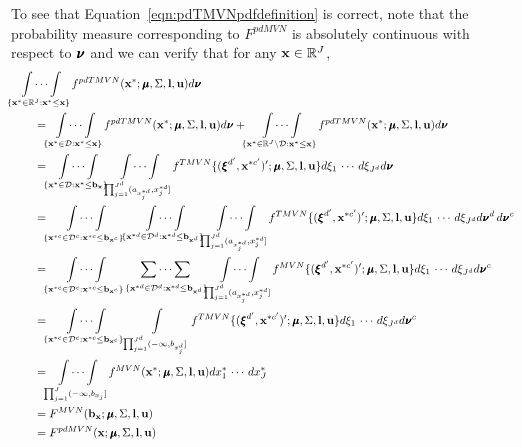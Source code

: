 \documentclass[fleqn]{article}
\begin{document}
To see that Equation~\eqref{eqn:pdTMVNpdfdefinition} is correct, note that the probability measure corresponding to $F^{pdMVN}$ is absolutely continuous with respect to $\bnu$ and we can verify that for any ${\bf x} \in \mathbb{R}^J$,
\begin{align}
&\idotsint\limits_{\{\bx^* \in \mathbb{R}^J : \bx^* \leq \bx \}} f^{pdTMVN}(\bx^* ; \bmu, \Sigma, \bl, \bu) d \bnu \label{eqn:pdTMVNpdfVerification1} \\
&\qquad = \idotsint\limits_{\{\bx^* \in \mathcal{D} : \bx^* \leq \bx \}} f^{pdTMVN}(\bx^* ; \bmu, \Sigma, \bl, \bu) d \bnu + \idotsint\limits_{\{\bx^* \in \mathbb{R}^J \setminus \mathcal{D} : \bx^* \leq \bx \}} f^{pdTMVN}(\bx^* ; \bmu, \Sigma, \bl, \bu) d \bnu \label{eqn:pdTMVNpdfVerification2} \\
&\qquad = \idotsint\limits_{\{\bx^* \in \mathcal{D} : \bx^* \leq \bb_\bx \}} \idotsint\limits_{\prod_{j=1}^{J^d}(a_{x^{*d}_j}, x^{*d}_j]} f^{TMVN}\{(\bxi^{d'}, \bx^{*c'})' ; \bmu, \Sigma, \bl, \bu\} d \xi_1 \, \cdots \, d \xi_{J^d} d \bnu \label{eqn:pdTMVNpdfVerification3} \\
&\qquad = \idotsint\limits_{\{\bx^{*c} \in \mathcal{D}^c : \bx^{*c} \leq \bb_{\bx^c} \vphantom{\mathcal{D}^d}\}} \, \idotsint\limits_{\{\bx^{*d} \in \mathcal{D}^d : \bx^{*d} \leq \bb_{\bx^d} \}} \idotsint\limits_{\prod_{j=1}^{J^d} (a_{x^{*d}_j}, x^{*d}_j]} f^{TMVN}\{(\bxi^{d'}, \bx^{*c'})' ; \bmu, \Sigma, \bl, \bu\} d \xi_1 \, \cdots \, d \xi_{J^d} d \bnu^d \, d \bnu^c \label{eqn:pdTMVNpdfVerification4} \\
&\qquad = \idotsint\limits_{\{\bx^{*c} \in \mathcal{D}^c : \bx^{*c} \leq \bb_{\bx^c} \vphantom{\mathcal{D}^d}\}} \mathop{\sum \cdots \sum \vphantom{\int}}\limits_{\{\bx^{*d} \in \mathcal{D}^d : \bx^{*d} \leq \bb_{\bx^d} \}} \idotsint\limits_{\prod_{j=1}^{J^d}(a_{x^{*d}_j}, x^{*d}_j]} f^{MVN}\{(\bxi^{d'}, \bx^{*c'})' ; \bmu, \Sigma, \bl, \bu\} d \xi_1 \, \cdots \, d \xi_{J^d} d \bnu^c \label{eqn:pdTMVNpdfVerification5} \\
&\qquad = \idotsint\limits_{\{\bx^{*c} \in \mathcal{D}^c : \bx^{*c} \leq \bb_{\bx^c} \}} \int\limits_{\prod_{j=1}^{J^d} (- \infty, b_{x^{d}_j}]} f^{TMVN}\{(\bxi^{d'}, \bx^{*c'})' ; \bmu, \Sigma, \bl, \bu\} d \xi_1 \, \cdots \, d \xi_{J^d} d \bnu^c \label{eqn:pdTMVNpdfVerification6} \\
&\qquad = \idotsint\limits_{\prod_{j=1}^{J}(- \infty, b_{x_j}]} f^{MVN}(\bx^* ; \bmu, \Sigma, \bl, \bu) d x^*_1 \, \cdots \, d x^*_{J} \label{eqn:pdTMVNpdfVerification7} \\
&\qquad = F^{MVN}(\bb_\bx ; \bmu, \Sigma, \bl, \bu) \label{eqn:pdTMVNpdfVerification8} \\
&\qquad = F^{pdMVN}(\bx ; \bmu, \Sigma, \bl, \bu) \label{eqn:pdTMVNpdfVerification9}
\end{align}
\end{document}
